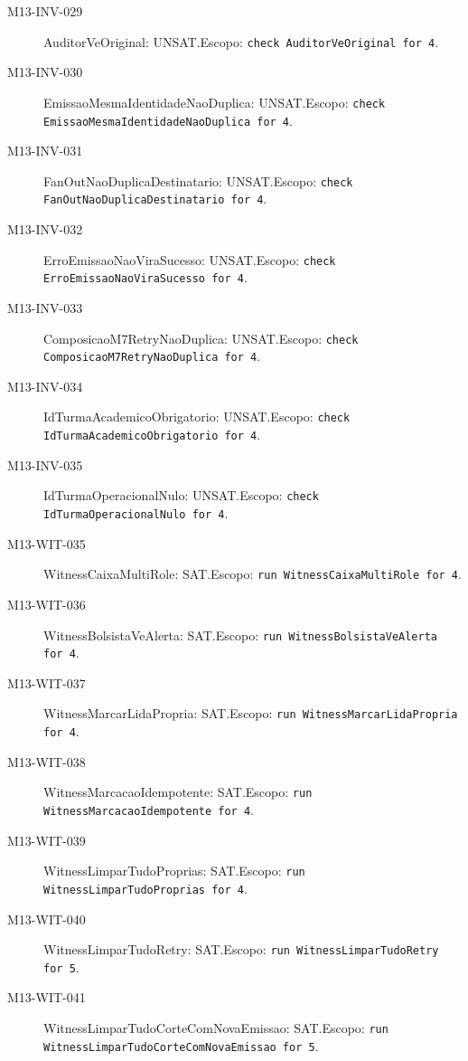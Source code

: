 \begin{description}
\item[M13-INV-029] AuditorVeOriginal: UNSAT.\newline Escopo: \texttt{check AuditorVeOriginal for 4}.
\item[M13-INV-030] EmissaoMesmaIdentidadeNaoDuplica: UNSAT.\newline Escopo: \texttt{check EmissaoMesmaIdentidadeNaoDuplica for 4}.
\item[M13-INV-031] FanOutNaoDuplicaDestinatario: UNSAT.\newline Escopo: \texttt{check FanOutNaoDuplicaDestinatario for 4}.
\item[M13-INV-032] ErroEmissaoNaoViraSucesso: UNSAT.\newline Escopo: \texttt{check ErroEmissaoNaoViraSucesso for 4}.
\item[M13-INV-033] ComposicaoM7RetryNaoDuplica: UNSAT.\newline Escopo: \texttt{check ComposicaoM7RetryNaoDuplica for 4}.
\item[M13-INV-034] IdTurmaAcademicoObrigatorio: UNSAT.\newline Escopo: \texttt{check IdTurmaAcademicoObrigatorio for 4}.
\item[M13-INV-035] IdTurmaOperacionalNulo: UNSAT.\newline Escopo: \texttt{check IdTurmaOperacionalNulo for 4}.
\item[M13-WIT-035] WitnessCaixaMultiRole: SAT.\newline Escopo: \texttt{run WitnessCaixaMultiRole for 4}.
\item[M13-WIT-036] WitnessBolsistaVeAlerta: SAT.\newline Escopo: \texttt{run WitnessBolsistaVeAlerta for 4}.
\item[M13-WIT-037] WitnessMarcarLidaPropria: SAT.\newline Escopo: \texttt{run WitnessMarcarLidaPropria for 4}.
\item[M13-WIT-038] WitnessMarcacaoIdempotente: SAT.\newline Escopo: \texttt{run WitnessMarcacaoIdempotente for 4}.
\item[M13-WIT-039] WitnessLimparTudoProprias: SAT.\newline Escopo: \texttt{run WitnessLimparTudoProprias for 4}.
\item[M13-WIT-040] WitnessLimparTudoRetry: SAT.\newline Escopo: \texttt{run WitnessLimparTudoRetry for 5}.
\item[M13-WIT-041] WitnessLimparTudoCorteComNovaEmissao: SAT.\newline Escopo: \texttt{run WitnessLimparTudoCorteComNovaEmissao for 5}.

\end{description}

